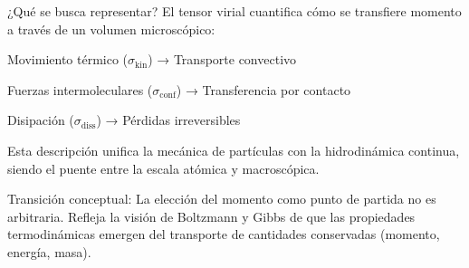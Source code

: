 \documentclass[../../main-notes.tex]{subfiles}
\begin{document}
¿Qué se busca representar?
El tensor virial cuantifica cómo se transfiere momento a través de un volumen microscópico:

Movimiento térmico ($\sigma_{\text{kin}}$) → Transporte convectivo

Fuerzas intermoleculares ($\sigma_{\text{conf}}$) → Transferencia por contacto

Disipación ($\sigma_{\text{diss}}$) → Pérdidas irreversibles

Esta descripción unifica la mecánica de partículas con la hidrodinámica continua, siendo el puente entre la escala atómica y macroscópica.

Transición conceptual: La elección del momento como punto de partida no es arbitraria. Refleja la visión de Boltzmann y Gibbs de que las propiedades termodinámicas emergen del transporte de cantidades conservadas (momento, energía, masa).
\end{document}
